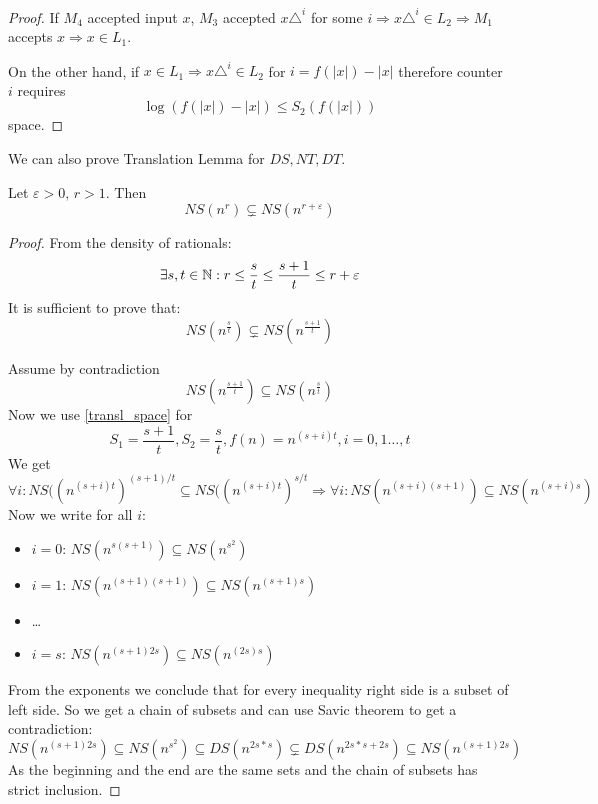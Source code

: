 \begin{proof}
If $M_4$ accepted input $x$, $M_3$ accepted $x\triangle^i$ for some $i \Rightarrow x\triangle^i \in L_2 \Rightarrow M_1$ accepts $x \Rightarrow x \in L_1$.

On the other hand, if $x \in L_1 \Rightarrow x\triangle^i \in L_2$ for $i = f(|x|) - |x|$ therefore counter $i$ requires
\[ \log(f(|x|) - |x|) \leq S_2(f(|x|)) \]
space.

\end{proof}

\begin{note}
	We can also prove Translation Lemma for $DS, NT, DT$.
\end{note}

\begin{theorem}
	Let $\varepsilon > 0,\, r > 1$. Then
	\[ NS(n^r) \subsetneq NS(n^{r + \varepsilon}) \]
\end{theorem}
\begin{proof}
	From the density of rationals:
	\[ \exists s,t \in \operatorname{\mathbb{N}}: r \leq \frac{s}{t} \leq \frac{s + 1}{t} \leq r + \varepsilon \]
	It is sufficient to prove that:
	\[ NS(n^{\frac{s}{t}}) \subsetneq NS(n^{\frac{s + 1}{t}}) \]

	Assume by contradiction
	\[ NS(n^{\frac{s+1}{t}}) \subseteq NS(n^{\frac{s}{t}}) \]
	Now we use \cref{transl_space} for
	\[ S_1 = \frac{s+1}{t}, S_2 = \frac{s}{t}, f(n) = n^{(s + i)t}, i = 0, 1 \ldots, t \]
	We get
	\[ \forall i: NS((n^{(s + i)t})^{(s + 1)/t} \subseteq NS((n^{(s + i)t})^{s/t} \Rightarrow \forall i: NS(n^{(s + i)(s + 1)}) \subseteq NS(n^{(s + i)s}) \]
	Now we write for all $i$:
	\begin{itemize}
		\item $i = 0:\, NS(n^{s(s + 1)}) \subseteq NS(n^{s^2}) $
		\item $i = 1:\, NS(n^{(s + 1)(s + 1)}) \subseteq NS(n^{(s + 1)s}) $
		\item \ldots
		\item $i = s:\, NS(n^{(s + 1)2s}) \subseteq NS(n^{(2s)s}) $
	\end{itemize}
	From the exponents we conclude that for every inequality right side is a subset of left side.
	So we get a chain of subsets and can use Savic theorem to get a contradiction:
	\[ NS(n^{(s + 1)2s}) \subseteq NS(n^{s^2}) \subseteq DS(n^{2s * s}) \subsetneq DS(n^{2s * s + 2s}) \subseteq NS(n^{(s + 1)2s}) \]
	As the beginning and the end are the same sets and the chain of subsets has strict inclusion.

\end{proof}
